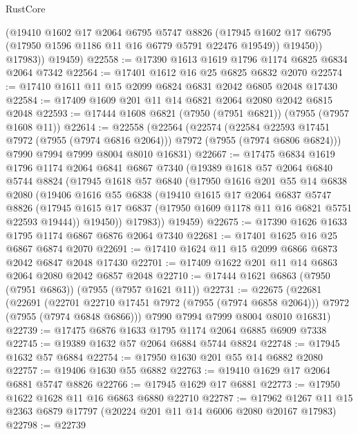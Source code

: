 \begin{lexlean}{RustCore}
\begin{coremodule}
            (@19410
              @1602
              @17
              @2064
              @6795
              @5747
              @8826
              (@17945 @1602 @17 @6795 (@17950 @1596 @1186 @11 @16 @6779 @5791 @22476 @19549))
              @19450))
          @17983))
      @19459)
@22558 := @17390 @1613 @1619 @1796 @1174 @6825 @6834 @2064 @7342
@22564 := @17401 @1612 @16 @25 @6825 @6832 @2070
@22574 := @17410 @1611 @11 @15 @2099 @6824 @6831 @2042 @6805 @2048 @17430
@22584 := @17409 @1609 @201 @11 @14 @6821 @2064 @2080 @2042 @6815 @2048
@22593 := @17444 @1608 @6821 (@7950 (@7951 @6821)) (@7955 (@7957 @1608 @11))
@22614 := @22558
    (@22564
      (@22574
        (@22584 @22593 @17451 @7972 (@7955 (@7974 @6816 @2064)))
        @7972
        (@7955 (@7974 @6806 @6824)))
      @7990
      @7994
      @7999
      @8004
      @8010
      @16831)
@22667 := @17475
    @6834
    @1619
    @1796
    @1174
    @2064
    @6841
    @6867
    @7340
    (@19389
      @1618
      @57
      @2064
      @6840
      @5744
      @8824
      (@17945
        @1618
        @57
        @6840
        (@17950
          @1616
          @201
          @55
          @14
          @6838
          @2080
          (@19406
            @1616
            @55
            @6838
            (@19410
              @1615
              @17
              @2064
              @6837
              @5747
              @8826
              (@17945 @1615 @17 @6837 (@17950 @1609 @1178 @11 @16 @6821 @5751 @22593 @19444))
              @19450))
          @17983))
      @19459)
@22675 := @17390 @1626 @1633 @1795 @1174 @6867 @6876 @2064 @7340
@22681 := @17401 @1625 @16 @25 @6867 @6874 @2070
@22691 := @17410 @1624 @11 @15 @2099 @6866 @6873 @2042 @6847 @2048 @17430
@22701 := @17409 @1622 @201 @11 @14 @6863 @2064 @2080 @2042 @6857 @2048
@22710 := @17444 @1621 @6863 (@7950 (@7951 @6863)) (@7955 (@7957 @1621 @11))
@22731 := @22675
    (@22681
      (@22691
        (@22701 @22710 @17451 @7972 (@7955 (@7974 @6858 @2064)))
        @7972
        (@7955 (@7974 @6848 @6866)))
      @7990
      @7994
      @7999
      @8004
      @8010
      @16831)
@22739 := @17475 @6876 @1633 @1795 @1174 @2064 @6885 @6909 @7338
@22745 := @19389 @1632 @57 @2064 @6884 @5744 @8824
@22748 := @17945 @1632 @57 @6884
@22754 := @17950 @1630 @201 @55 @14 @6882 @2080
@22757 := @19406 @1630 @55 @6882
@22763 := @19410 @1629 @17 @2064 @6881 @5747 @8826
@22766 := @17945 @1629 @17 @6881
@22773 := @17950 @1622 @1628 @11 @16 @6863 @6880 @22710
@22787 := @17962 @1267 @11 @15 @2363 @6879 @17797 (@20224 @201 @11 @14 @6006 @2080 @20167 @17983)
@22798 := @22739

\end{coremodule}
\end{lexlean}
